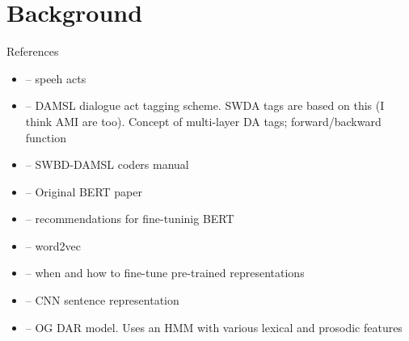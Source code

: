 \documentclass[11pt,a4paper]{article}
\begin{document}
\section{Background} %

References
\begin{itemize}
  \item \citet{austinHowThingsWords2009} -- speeh acts
  \item \citet{coreCodingDialogsDAMSL1997} -- DAMSL dialogue act tagging scheme. SWDA tags are based on this (I think AMI are too). Concept of multi-layer DA tags; forward/backward function
  \item \citet{jurafskySwitchboardSWBDDAMSLShallowDiscourseFunction1997a} -- SWBD-DAMSL coders manual
  \item \citet{devlinBERTPretrainingDeep2018} -- Original BERT paper
  \item \citet{sunHowFineTuneBERT2019} -- recommendations for fine-tuninig BERT
  \item \citet{mikolovDistributedRepresentationsWords2013} -- word2vec
  \item \citet{petersTuneNotTune2019} -- when and how to fine-tune pre-trained representations
  \item \citet{kimConvolutionalNeuralNetworks2014} -- CNN sentence representation
  \item \citet{stolckeDialogueActModeling2000} -- OG DAR model. Uses an HMM with various lexical and prosodic features
\end{itemize}
\end{document}
